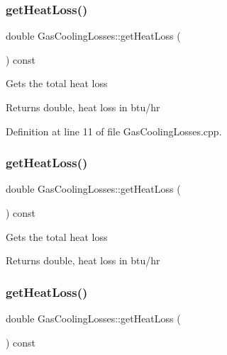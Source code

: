 \subsubsection{\texorpdfstring{get\+Heat\+Loss()}{getHeatLoss()}\hspace{0.1cm}{\footnotesize\ttfamily [1/3]}}
{\footnotesize\ttfamily double Gas\+Cooling\+Losses\+::get\+Heat\+Loss (\begin{DoxyParamCaption}{ }\end{DoxyParamCaption}) const}

Gets the total heat loss \begin{DoxyReturn}{Returns}
double, heat loss in btu/hr 
\end{DoxyReturn}


Definition at line 11 of file Gas\+Cooling\+Losses.\+cpp.

\mbox{\label{class_gas_cooling_losses_a3c18b6d1ef3124d883daf85560ec7bd7}} 
\subsubsection{\texorpdfstring{get\+Heat\+Loss()}{getHeatLoss()}\hspace{0.1cm}{\footnotesize\ttfamily [2/3]}}
{\footnotesize\ttfamily double Gas\+Cooling\+Losses\+::get\+Heat\+Loss (\begin{DoxyParamCaption}{ }\end{DoxyParamCaption}) const}

Gets the total heat loss \begin{DoxyReturn}{Returns}
double, heat loss in btu/hr 
\end{DoxyReturn}
\mbox{\label{class_gas_cooling_losses_a3c18b6d1ef3124d883daf85560ec7bd7}} 
\subsubsection{\texorpdfstring{get\+Heat\+Loss()}{getHeatLoss()}\hspace{0.1cm}{\footnotesize\ttfamily [3/3]}}
{\footnotesize\ttfamily double Gas\+Cooling\+Losses\+::get\+Heat\+Loss (\begin{DoxyParamCaption}{ }\end{DoxyParamCaption}) const}

